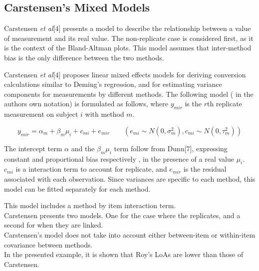\documentclass{report}
\begin{document}
	\subsection{Carstensen's Mixed Models}
	
	
	Carstensen \textit{et al}[4] presents a model to describe the relationship between a value of measurement and its real value.
	The non-replicate case is considered first, as it is the context of the Bland-Altman plots.
	This model assumes that inter-method bias is the only difference between the two methods.
	
	Carstensen \textit{et al}[4] proposes linear mixed effects models for deriving
	conversion calculations similar to Deming's regression, and for
	estimating variance components for measurements by different
	methods. The following model ( in the authors own notation) is
	formulated as follows, where $y_{mir}$ is the $r$th replicate
	measurement on subject $i$ with method $m$.
	
	\begin{equation}
	y_{mir}  = \alpha_{m} + \beta_{m}\mu_{i} + c_{mi} + e_{mir} \qquad
	( e_{mi} \sim N(0,\sigma^{2}_{m}), c_{mi} \sim N(0,\tau^{2}_{m}))
	\end{equation}
	
	The intercept term $\alpha$ and the $\beta_{m}\mu_{i}$ term follow
	from Dunn[7], expressing constant and proportional bias
	respectively , in the presence of a real value $\mu_{i}.$
	$c_{mi}$ is a interaction term to account for replicate, and
	$e_{mir}$ is the residual associated with each observation.
	Since variances are specific to each method, this model can be
	fitted separately for each method.
	
	
	This model includes a method by item interaction term.\\
	
	Carstensen presents two models. One for the case where the replicates, and a second for when they are linked.\\
	Carstensen's model does not take into account either between-item or within-item covariance between methods.\\
	In the presented example, it is shown that Roy's LoAs are lower than those of Carstensen.
	
\end{document}
